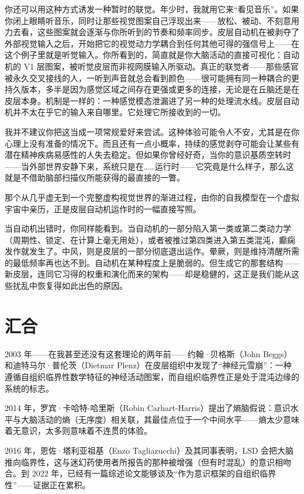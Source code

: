 \documentclass[11pt, twoside, openright]{book}
\begin{document}
你还可以用这种方式诱发一种暂时的联觉。年少时，我就用它来“看见音乐”。如果你闭上眼睛听音乐，同时让那些视觉图案自己浮现出来------放松、被动、不刻意用力去看，这些图案就会逐渐与你所听到的节奏和频率同步。皮层自动机在被剥夺了外部视觉输入之后，开始把它的视觉动力学耦合到任何其他可得的强信号上------在这个例子里就是听觉输入。你所看到的，简直就是你大脑活动的直接可视化：自动机的 V1 层图案，被听觉皮层而非视网膜输入所驱动。真正的联觉者------那些感官被永久交叉接线的人，一听到声音就总会看到颜色------很可能拥有同一种耦合的更持久版本，多半是因为感觉区域之间存在更强或更多的连接，无论是在丘脑还是在皮层本身。机制是一样的：一种感觉模态泄漏进了另一种的处理流水线。皮层自动机并不太在乎它的输入来自哪里。它处理它所接收到的一切。

我并不建议你把这当成一项常规爱好来尝试。这种体验可能令人不安，尤其是在你心理上没有准备的情况下。而且还有一点小概率，持续的感觉剥夺可能会让某些有潜在精神疾病易感性的人失去稳定。但如果你曾经好奇，当你的意识基质空转时------当外部世界安静下来，系统只是在……运行时------它究竟是什么样子，那么这就是不借助脑部扫描仪所能获得的最直接的一瞥。

那个从几乎虚无到一个完整虚构视觉世界的渐进过程，由你的自我模型在一个虚拟宇宙中亲历，正是皮层自动机运作时的一幅直接写照。

当自动机出错时，你同样能看到。当自动机的一部分陷入第一类或第二类动力学（周期性、锁定、在计算上毫无用处），或者被推过第四类进入第五类混沌，癫痫发作就发生了。中风，则是皮层的一部分彻底退出运作。晕厥，则是维持清醒所需的最低频率再也达不到。自动机在某种程度上是脆弱的。但生成它的那套结构------新皮层，连同它习得的权重和演化而来的架构------却是稳健的，这正是我们能从这些扰乱中恢复得如此出色的原因。

\section*{汇合}

2003 年------在我甚至还没有这套理论的两年前------约翰·贝格斯（John Beggs）和迪特马尔·普伦茨（Dietmar Plenz）在皮层组织中发现了“神经元雪崩”：一种遵循自组织临界性数学特征的神经活动图案，而自组织临界性正是处于混沌边缘的系统的标志。

2014 年，罗宾·卡哈特-哈里斯（Robin Carhart-Harris）提出了熵脑假说：意识水平与大脑活动的熵（无序度）相关联，其最佳点位于一个中间水平------熵太少意味着无意识，太多则意味着不连贯的体验。

2016 年，恩佐·塔利亚祖基（Enzo Tagliazucchi）及其同事表明，LSD 会把大脑推向临界性，这与迷幻药使用者所报告的那种被增强（但有时混乱）的意识相吻合。到 2022 年，已经有一篇综述论文能够谈及“作为意识框架的自组织临界性”------证据正在累积。
\end{document}
